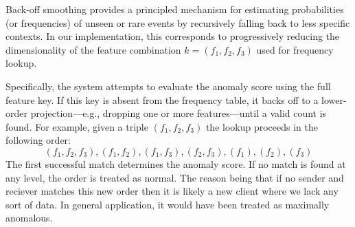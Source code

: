 Back-off smoothing provides a principled mechanism for estimating probabilities (or frequencies) of unseen or rare events by recursively falling back to less specific contexts. In our implementation, this corresponds to progressively reducing the dimensionality of the feature combination $k=(f_1, f_2, f_3)$ used for frequency lookup.

Specifically, the system attempts to evaluate the anomaly score using the full feature key. If this key is absent from the frequency table, it backs off to a lower-order projection—e.g., dropping one or more features—until a valid count is found. For example, given a triple $(f_1, f_2, f_3)$ the lookup proceeds in the following order:
$$
(f_1, f_2, f_3), (f_1, f_2), (f_1, f_3), (f_2, f_3), (f_1), (f_2), (f_3)
$$
The first successful match determines the anomaly score. If no match is found at any level, the order is treated as normal. The reason being that if no sender and reciever matches this new order then it is likely a new client where we lack any sort of data. In general application, it would have been treated as maximally anomalous.

